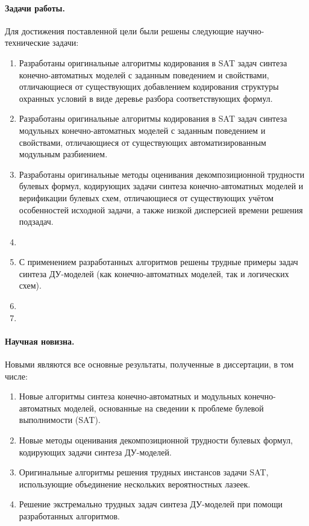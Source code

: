 \paragraph*{Задачи работы.}
%
Для достижения поставленной цели были решены следующие научно-технические задачи:
\begin{enumerate}[beginpenalty=10000]
    \item Разработаны оригинальные алгоритмы кодирования в SAT задач синтеза конечно-автоматных моделей с заданным поведением и свойствами, отличающиеся от существующих добавлением кодирования структуры охранных условий в виде деревье разбора соответствующих формул.
    \item Разработаны оригинальные алгоритмы кодирования в SAT задач синтеза модульных конечно-автоматных моделей с заданным поведением и свойствами, отличающиеся от существующих автоматизированным модульным разбиением.
    \item Разработаны оригинальные методы оценивания декомпозиционной трудности булевых формул, кодирующих задачи синтеза конечно-автоматных моделей и верификации булевых схем, отличающиеся от существующих учётом особенностей исходной задачи, а также низкой дисперсией времени решения подзадач.
    \item {}
    \item С применением разработанных алгоритмов решены трудные примеры задач синтеза ДУ-моделей (как конечно-автоматных моделей, так и логических схем).
    \item {}
    \item {}
\end{enumerate}


\paragraph*{Научная новизна.}
%
Новыми являются все основные результаты, полученные в диссертации, в том числе:
\begin{enumerate}[beginpenalty=10000]
    \item Новые алгоритмы синтеза конечно-автоматных и модульных конечно-автоматных моделей, основанные на сведении к проблеме булевой выполнимости (SAT).

    \item Новые методы оценивания декомпозиционной трудности булевых формул, кодирующих задачи синтеза ДУ-моделей.

    \item Оригинальные алгоритмы решения трудных инстансов задачи SAT, использующие объединение нескольких вероятностных лазеек.

    \item Решение экстремально трудных задач синтеза ДУ-моделей при помощи разработанных алгоритмов.
\end{enumerate}


